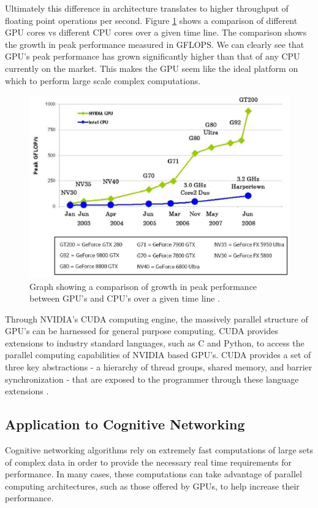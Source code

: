 Ultimately this difference in architecture translates to higher throughput of floating point operations per second.  Figure \ref{fig:cpu_vs_gpu_gflops} shows a comparison of different GPU cores vs different CPU cores over a given time line.  The comparison shows the growth in peak performance measured in GFLOPS.  We can clearly see that GPU's peak performance has grown significantly higher than that of any CPU currently on the market.  This makes the GPU seem like the ideal platform on which to perform large scale complex computations.

\begin{figure}[ht]
\begin{center}
 \includegraphics[scale=0.65]{images/gpu_images/cpu_vs_gpu_gflops.eps}
\end{center}
\caption{Graph showing a comparison of growth in peak performance between GPU's and CPU's over a given time line \cite{Nvidia08}.}
\label{fig:cpu_vs_gpu_gflops}
\end{figure}

Through NVIDIA's CUDA computing engine, the massively parallel structure of GPU's can be harnessed for general purpose computing.  CUDA provides extensions to industry standard languages, such as C and Python, to access the parallel computing capabilities of NVIDIA based GPU's.  CUDA provides a set of three key abstractions - a hierarchy of thread groups, shared memory, and barrier synchronization - that are exposed to the programmer through these language extensions \cite{Nvidia08}.

\subsection{Application to Cognitive Networking}
\label{subsect:app_to_cognet}
Cognitive networking algorithms rely on extremely fast computations of large sets of complex data in order to provide the necessary real time requirements for performance.  In many cases, these computations can take advantage of parallel computing architectures, such as those offered by GPUs, to help increase their performance.

